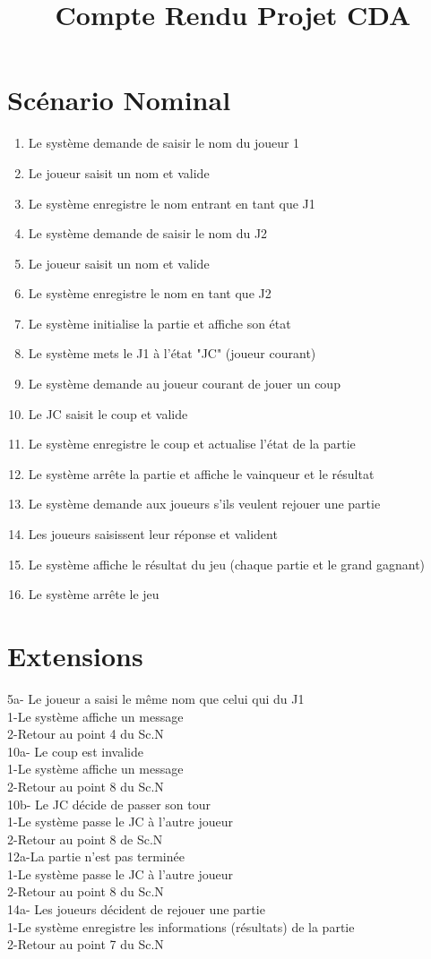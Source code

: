 \documentclass[10pt,a4paper]{article}
\title{Compte Rendu Projet CDA}
\author{}
\date{}
\newcommand\tab[1][1cm]{\hspace*{#1}}
\begin{document}
\maketitle
\section*{Scénario Nominal}
\begin{enumerate}
\item Le système demande de saisir le nom du joueur 1
\item Le joueur saisit un nom et valide
\item Le système enregistre le nom entrant en tant que J1
\item Le système demande de saisir le nom du J2
\item Le joueur saisit un nom et valide
\item Le système enregistre le nom en tant que J2
\item Le système initialise la partie et affiche son état
\item Le système mets le J1 à l'état "JC" (joueur courant)
\item Le système demande au joueur courant de jouer un coup
\item Le JC saisit le coup et valide
\item Le système enregistre le coup et actualise l'état de la partie
\item Le système arrête la partie et affiche le vainqueur et le résultat
\item Le système demande aux joueurs s'ils veulent rejouer une partie
\item Les joueurs saisissent leur réponse et valident
\item Le système affiche le résultat du jeu (chaque partie et le grand gagnant)
\item Le système arrête le jeu
\end{enumerate}
\section*{Extensions}
5a- Le joueur a saisi le même nom que celui qui du J1\\
\tab 1-Le système affiche un message\\
\tab 2-Retour au point 4 du Sc.N\\
10a- Le coup est invalide\\
\tab 1-Le système affiche un message\\
\tab 2-Retour au point 8 du Sc.N\\
10b- Le JC décide de passer son tour\\
\tab 1-Le système passe le JC à l'autre joueur\\
\tab 2-Retour au point 8 de Sc.N\\
12a-La partie n'est pas terminée\\
\tab 1-Le système passe le JC à l'autre joueur\\
\tab 2-Retour au point 8 du Sc.N\\
14a- Les joueurs décident de rejouer une partie\\
\tab 1-Le système enregistre les informations (résultats) de la partie\\
\tab 2-Retour au point 7 du Sc.N
\end{document}
